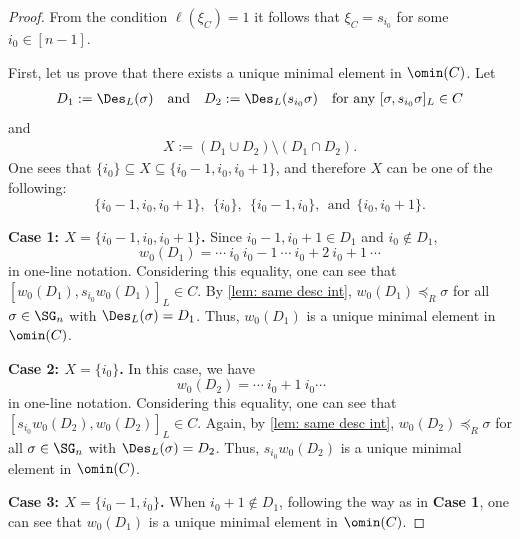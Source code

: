 \documentclass[12pt, reqno]{amsart}
\theoremstyle{definition}
\numberwithin{equation}{section} \numberwithin{figure}{section}
\numberwithin{table}{section}
\begin{document}
\begin{proof}
From the condition $\ell(\xi_C) = 1$ it follows that  $\xi_C = s_{i_0}$ 
for some $i_0 \in [n-1]$.

First, let us prove that  there exists a unique minimal element in $\omin(C)$.
Let
\begin{align}\label{eq: D_1 and D_2}
D_1 := \Des_L(\sigma)
\quad \text{and} \quad
D_2 := \Des_L(s_{i_0}\sigma)
\quad \text{for any $[\sigma, s_{i_0}\sigma]_L \in C$}
\end{align}
and 
\begin{align}\label{eq: X(C)}
X := (D_1 \cup D_2) \setminus (D_1 \cap D_2).
\end{align} 
One sees that $\{i_0\} \subseteq X \subseteq \{i_0 - 1, i_0, i_0 + 1\}$, and therefore $X$ can be one of the following:
\[
\{i_0-1, i_0, i_0+1\}, \ \
\{i_0\}, \ \  
\{i_0-1, i_0\}, \ \ \text{and} \ \  
\{i_0, i_0+1\}.
\]





{\bf Case 1: $X = \{i_0 - 1, i_0, i_0 + 1\}$.} 
Since  $i_0 - 1, i_0+1 \in D_1$ and $i_0 \notin D_1$,
\[
w_0(D_1) = \cdots \ i_0 \  i_0 - 1 \  \cdots \  i_0+2 \  i_0+1 \ \cdots 
\]
in one-line notation.
Considering this equality, one can see that
$[w_0(D_1), s_{i_0} w_0(D_1)]_L \in C$.
By \cref{lem: same desc int}, 
$w_0(D_1) \preceq_R \sigma$ for all $\sigma \in \SG_n$ with $\Des_L(\sigma) = D_1$.
Thus, $w_0(D_1)$ is a unique minimal element in $\omin(C)$.


{\bf Case 2: $X = \{i_0\}$.}
In this case, we have
\[
w_0(D_2) = \cdots \  i_0 + 1 \  i_0 \cdots \  \quad 
\]
in one-line notation.
Considering this equality, one can see that $[s_{i_0} w_0(D_2),  w_0(D_2)]_L \in C$.
Again, by \cref{lem: same desc int}, 
$w_0(D_2) \preceq_R \sigma$ for all $\sigma \in \SG_n$ with $\Des_L(\sigma) = D_2$. 
Thus, $s_{i_0} w_0(D_2)$ is a unique minimal element in $\omin(C)$.




{\bf Case 3: $X = \{i_0-1, i_0\}$.}
When $i_0 + 1 \notin D_1$,
following the way as in {\bf Case 1}, 
one can see that  $w_0(D_1)$ is a unique minimal element in $\omin(C)$.


\end{proof}
\end{document}
